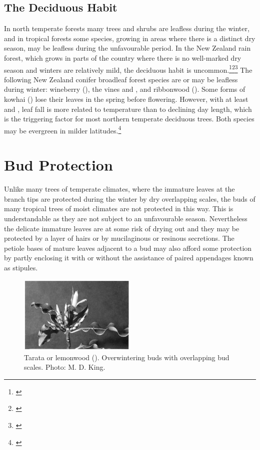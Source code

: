 \subsection{The Deciduous Habit}

In north temperate forests many trees and shrubs are leafless during the winter, and in tropical forests some species, growing in areas where there is a distinct dry season, may be leafless during the unfavourable period.
In the New Zealand rain forest, which grows in parts of the country where there is no well-marked dry season and winters are relatively mild, the deciduous habit is uncommon.\footnote{\cite{bussell1968growth}}\footnote{\cite{bussell1968effects}}\footnote{\cite{russel1936mechanism}} The following New Zealand conifer broadleaf forest species are or may be leafless during winter: wineberry (), the vines  and , and ribbonwood ().
Some forms of kowhai () lose their leaves in the spring before flowering.
However, with at least  and , leaf fall is more related to temperature than to declining day length, which is the triggering factor for most northern temperate deciduous trees.
Both species may be evergreen in milder latitudes.\footnote{\cite{cockayne1928vegetation}}

\section{Bud Protection}

Unlike many trees of temperate climates, where the immature leaves at the branch tips are protected during the winter by dry overlapping scales, the buds of many tropical trees of moist climates are not protected in this way.
This is understandable as they are not subject to an unfavourable season.
Nevertheless the delicate immature leaves are at some risk of drying out and they may be protected by a layer of hairs or by mucilaginous or resinous secretions.
The petiole bases of mature leaves adjacent to a bud may also afford some protection by partly enclosing it with or without the assistance of paired appendages known as stipules.

\begin{figure}
	\includegraphics[width=0.5\textwidth]{graphics/figure24tarata.jpg}
	\centering
	\caption[Tarata or lemonwood]{Tarata or lemonwood (). Overwintering buds with overlapping bud scales. Photo: M. D. King.}
	\label{fig:24tarata}
\end{figure}

